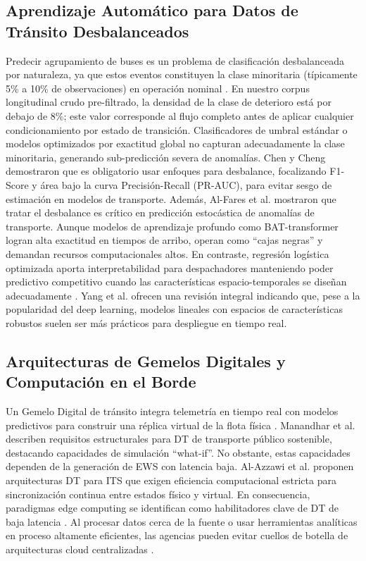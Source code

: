 \documentclass[journal,twocolumn]{IEEEtran}
\begin{document}
\subsection{Aprendizaje Automático para Datos de Tránsito Desbalanceados}
Predecir agrupamiento de buses es un problema de clasificación desbalanceada por naturaleza, ya que estos eventos constituyen la clase minoritaria (típicamente 5\% a 10\% de observaciones) en operación nominal \cite{16}. En nuestro corpus longitudinal crudo pre-filtrado, la densidad de la clase de deterioro está por debajo de 8\%; este valor corresponde al flujo completo antes de aplicar cualquier condicionamiento por estado de transición. Clasificadores de umbral estándar o modelos optimizados por exactitud global no capturan adecuadamente la clase minoritaria, generando sub-predicción severa de anomalías. Chen y Cheng \cite{17} demostraron que es obligatorio usar enfoques para desbalance, focalizando F1-Score y área bajo la curva Precisión-Recall (PR-AUC), para evitar sesgo de estimación en modelos de transporte. Además, Al-Fares et al. \cite{18} mostraron que tratar el desbalance es crítico en predicción estocástica de anomalías de transporte. Aunque modelos de aprendizaje profundo como BAT-transformer \cite{19} logran alta exactitud en tiempos de arribo, operan como ``cajas negras'' y demandan recursos computacionales altos. En contraste, regresión logística optimizada aporta interpretabilidad para despachadores manteniendo poder predictivo competitivo cuando las características espacio-temporales se diseñan adecuadamente \cite{20}. Yang et al. \cite{21} ofrecen una revisión integral indicando que, pese a la popularidad del deep learning, modelos lineales con espacios de características robustos suelen ser más prácticos para despliegue en tiempo real.

\subsection{Arquitecturas de Gemelos Digitales y Computación en el Borde}
Un Gemelo Digital de tránsito integra telemetría en tiempo real con modelos predictivos para construir una réplica virtual de la flota física \cite{22,23}. Manandhar et al. \cite{24} describen requisitos estructurales para DT de transporte público sostenible, destacando capacidades de simulación ``what-if''. No obstante, estas capacidades dependen de la generación de EWS con latencia baja. Al-Azzawi et al. \cite{25} proponen arquitecturas DT para ITS que exigen eficiencia computacional estricta para sincronización continua entre estados físico y virtual. En consecuencia, paradigmas edge computing se identifican como habilitadores clave de DT de baja latencia \cite{26}. Al procesar datos cerca de la fuente o usar herramientas analíticas en proceso altamente eficientes, las agencias pueden evitar cuellos de botella de arquitecturas cloud centralizadas \cite{27}.
\end{document}
